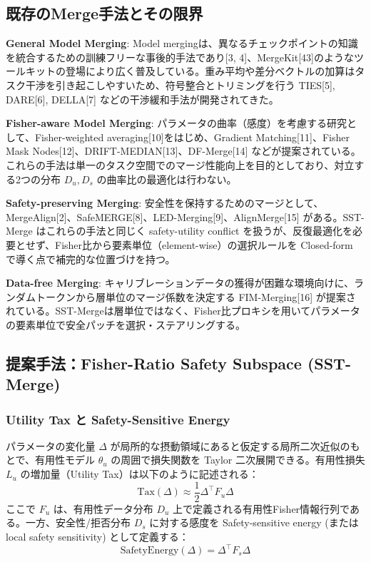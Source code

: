 \documentclass{article}
\begin{document}
\subsection{既存のMerge手法とその限界}
\textbf{General Model Merging}: Model mergingは、異なるチェックポイントの知識を統合するための訓練フリーな事後的手法であり[3, 4]、MergeKit[43]のようなツールキットの登場により広く普及している。重み平均や差分ベクトルの加算はタスク干渉を引き起こしやすいため、符号整合とトリミングを行う TIES[5], DARE[6], DELLA[7] などの干渉緩和手法が開発されてきた。

\textbf{Fisher-aware Model Merging}: パラメータの曲率（感度）を考慮する研究として、Fisher-weighted averaging[10]をはじめ、Gradient Matching[11]、Fisher Mask Nodes[12]、DRIFT-MEDIAN[13]、DF-Merge[14] などが提案されている。これらの手法は単一のタスク空間でのマージ性能向上を目的としており、対立する2つの分布 $D_u, D_s$ の曲率比の最適化は行わない。

\textbf{Safety-preserving Merging}: 安全性を保持するためのマージとして、MergeAlign[2]、SafeMERGE[8]、LED-Merging[9]、AlignMerge[15] がある。SST-Merge はこれらの手法と同じく safety-utility conflict を扱うが、反復最適化を必要とせず、Fisher比から要素単位（element-wise）の選択ルールを Closed-form で導く点で補完的な位置づけを持つ。

\textbf{Data-free Merging}: キャリブレーションデータの獲得が困難な環境向けに、ランダムトークンから層単位のマージ係数を決定する FIM-Merging[16] が提案されている。SST-Mergeは層単位ではなく、Fisher比プロキシを用いてパラメータの要素単位で安全パッチを選択・ステアリングする。

\subsection{提案手法：Fisher-Ratio Safety Subspace (SST-Merge)}

\subsubsection{Utility Tax と Safety-Sensitive Energy}
パラメータの変化量 $\Delta$ が局所的な摂動領域にあると仮定する局所二次近似のもとで、有用性モデル $\theta_u$ の周囲で損失関数を Taylor 二次展開できる。有用性損失 $L_u$ の増加量（Utility Tax）は以下のように記述される：
\[ \text{Tax}(\Delta) \approx \frac{1}{2} \Delta^\top F_u \Delta \]
ここで $F_u$ は、有用性データ分布 $D_u$ 上で定義される有用性Fisher情報行列である。一方、安全性/拒否分布 $D_s$ に対する感度を Safety-sensitive energy (または local safety sensitivity) として定義する：
\[ \text{SafetyEnergy}(\Delta) = \Delta^\top F_s \Delta \]
\end{document}
